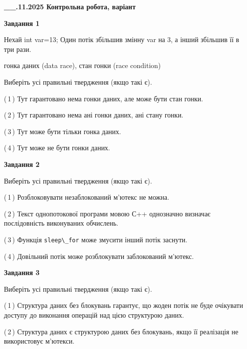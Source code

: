 \documentclass[12pt, ukrainian]{article}
\def\code#1{\Verb!#1!}
\begin{document}
\begin {large}

\textbf{\_\_.11.2025 Контрольна робота, варіант  }\par


{

\begin{center}
\textbf{Завдання 1}
\end{center}
Нехай int var=13; Один потік збільшив змінну var на 3, а інший збільшив її в три рази.

гонка даних (data race), стан гонки (race condition)

Виберіть усі правильні твердження (якщо такі є).\par
\vspace{2mm}
(\,1\,) Тут гарантовано нема гонки даних, але може бути стан гонки.%

(\,2\,) Тут гарантовано нема ані гонки даних, ані стану гонки.%

(\,3\,) Тут може бути тільки гонка даних.%

(\,4\,) Тут може не бути гонки даних.%



\begin{center}
\textbf{Завдання 2}
\end{center}
Виберіть усі правильні твердження (якщо такі є).\par
\vspace{2mm}

(\,1\,) Розблоковувати незаблокований м’ютекс не можна.%

(\,2\,) Текст однопотокової програми мовою С++ однозначно визначає послідовність виконуваних обчислень.%

(\,3\,) Функція \code{sleep\_for} може змусити інший потік заснути.%

(\,4\,) Довільний потік може розблокувати заблокований м’ютекс.%



\begin{center}
\textbf{Завдання 3}
\end{center}
Виберіть усі правильні твердження (якщо такі є).\par
\vspace{2mm}

(\,1\,) Структура даних без блокувань гарантує, що жоден потік не буде очікувати доступу до виконання операцій над цією структурою даних.%

(\,2\,) Структура даних є структурою даних без блокувань, якщо її реалізація не використовує м’ютекси.%

}
\end{large}
\end{document}
